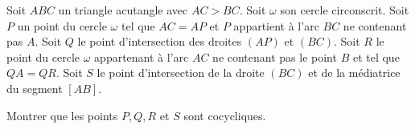 Soit $ABC$ un triangle acutangle avec $AC>BC$. Soit $\omega$ son cercle circonscrit. Soit $P$ un point du cercle $\omega$ tel que $AC=AP$ et $P$ appartient à l'arc $BC$ ne contenant pas $A$. Soit $Q$ le point d'intersection des droites $(AP)$ et $(BC)$. Soit $R$ le point du cercle $\omega$ appartenant à l'arc $AC$ ne contenant pas le point $B$ et tel que $QA=QR$. Soit $S$ le point d'intersection de la droite $(BC)$ et de la médiatrice du segment $[AB]$.

Montrer que les points $P, Q, R$ et $S$ sont cocycliques.